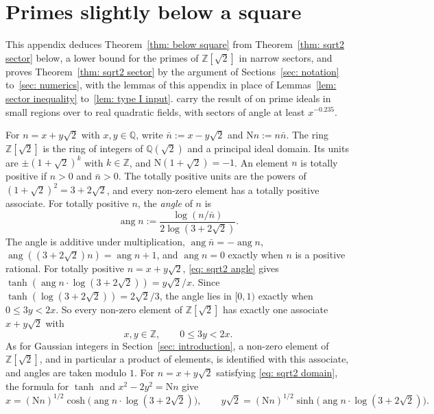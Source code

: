 \documentclass{article}
\numberwithin{equation}{section}
\newcommand{\Le}{\leqslant}
\begin{document}
\section{Primes slightly below a square}
\label{app: sqrt2}

This appendix deduces Theorem~\ref{thm: below square} from Theorem~\ref{thm: sqrt2 sector} below, a lower bound for the primes of $\mathbb{Z}[\sqrt{2}]$ in narrow sectors, and proves Theorem~\ref{thm: sqrt2 sector} by the argument of Sections~\ref{sec: notation} to~\ref{sec: numerics}, with the lemmas of this appendix in place of Lemmas~\ref{lem: sector inequality} to~\ref{lem: type I input}. \citet{baier2024note} carry the result of \citet{harman2004prime} on prime ideals in small regions over to real quadratic fields, with sectors of angle at least $x^{-0.235}$.

For $n = x + y\sqrt{2}$ with $x, y \in \mathbb{Q}$, write $\bar n := x - y\sqrt{2}$ and $\mathrm{N}n := n\bar n$. The ring $\mathbb{Z}[\sqrt{2}]$ is the ring of integers of $\mathbb{Q}(\sqrt{2})$ and a principal ideal domain. Its units are $\pm(1 + \sqrt{2})^k$ with $k \in \mathbb{Z}$, and $\mathrm{N}(1 + \sqrt{2}) = -1$. An element $n$ is totally positive if $n > 0$ and $\bar n > 0$. The totally positive units are the powers of $(1 + \sqrt{2})^2 = 3 + 2\sqrt{2}$, and every non-zero element has a totally positive associate. For totally positive $n$, the \emph{angle} of $n$ is
\begin{equation}
\label{eq: sqrt2 angle}
\operatorname{ang} n := \frac{\log(n/\bar n)}{2\log(3 + 2\sqrt{2})}.
\end{equation}
The angle is additive under multiplication, $\operatorname{ang}\bar n = -\operatorname{ang} n$, $\operatorname{ang}((3 + 2\sqrt{2})n) = \operatorname{ang} n + 1$, and $\operatorname{ang} n = 0$ exactly when $n$ is a positive rational. For totally positive $n = x + y\sqrt{2}$, \eqref{eq: sqrt2 angle} gives $\tanh(\operatorname{ang} n \cdot \log(3 + 2\sqrt{2})) = y\sqrt{2}/x$. Since $\tanh(\log(3 + 2\sqrt{2})) = 2\sqrt{2}/3$, the angle lies in $[0, 1)$ exactly when $0 \Le 3y < 2x$. So every non-zero element of $\mathbb{Z}[\sqrt{2}]$ has exactly one associate $x + y\sqrt{2}$ with
\begin{equation}
\label{eq: sqrt2 domain}
x, y \in \mathbb{Z}, \qquad 0 \Le 3y < 2x.
\end{equation}
As for Gaussian integers in Section~\ref{sec: introduction}, a non-zero element of $\mathbb{Z}[\sqrt{2}]$, and in particular a product of elements, is identified with this associate, and angles are taken modulo $1$. For $n = x + y\sqrt{2}$ satisfying \eqref{eq: sqrt2 domain}, the formula for $\tanh$ and $x^2 - 2y^2 = \mathrm{N}n$ give
\begin{equation}
\label{eq: sqrt2 coordinates}
x = (\mathrm{N}n)^{1/2} \cosh\bigl( \operatorname{ang} n \cdot \log(3 + 2\sqrt{2}) \bigr), \qquad y\sqrt{2} = (\mathrm{N}n)^{1/2} \sinh\bigl( \operatorname{ang} n \cdot \log(3 + 2\sqrt{2}) \bigr).
\end{equation}
\end{document}
